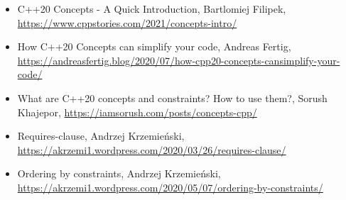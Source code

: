 \begin{itemize}
\item
C++20 Concepts - A Quick Introduction, Bartlomiej Filipek, \url{https://www.cppstories.com/2021/concepts-intro/}

\item
How C++20 Concepts can simplify your code, Andreas Fertig, \url{https://andreasfertig.blog/2020/07/how-cpp20-concepts-cansimplify-your-code/}

\item
What are C++20 concepts and constraints? How to use them?, Sorush Khajepor, \url{https://iamsorush.com/posts/concepts-cpp/}

\item
Requires-clause, Andrzej Krzemieński, \url{https://akrzemi1.wordpress.com/2020/03/26/requires-clause/}

\item
Ordering by constraints, Andrzej Krzemieński, \url{https://akrzemi1.wordpress.com/2020/05/07/ordering-by-constraints/}
\end{itemize}